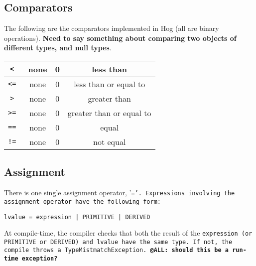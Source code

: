 \documentclass{book}
\begin{document}

\subsection{Comparators} %
\label{sub:comparators}

The following are the comparators implemented in Hog (all are binary operations).
\textbf{Need to say something about comparing two objects of different types, and
null types}.

\begin{center}
\begin{tabular}{|c|c|c|c|}

\hline
\tt < \rm & none & 0 & less than \\ \hline
\tt <= \rm & none & 0 & less than or equal to \\ \hline
\tt > \rm & none & 0 & greater than \\ \hline
\tt >= \rm & none & 0 & greater than or equal to \\ \hline
\tt == \rm & none & 0 & equal \\ \hline
\tt != \rm & none & 0 & not equal \\ \hline

\end{tabular}
\end{center}


\subsection{Assignment} %
\label{sub:assignment}

There is one single assignment operator, '\tt =\rm'. Expressions involving the
assignment operator have the following form:

\begin{verbatim}
lvalue = expression | PRIMITIVE | DERIVED
\end{verbatim}

At compile-time, the compiler checks that both the result of the \tt expression \rm
(or \tt PRIMITIVE \rm or \tt DERIVED\rm) and \tt lvalue \rm have the same type. If
not, the compile throws a \tt TypeMistmatchException\rm. \textbf{@ALL: should this
be a run-time exception?}



\end{document}
